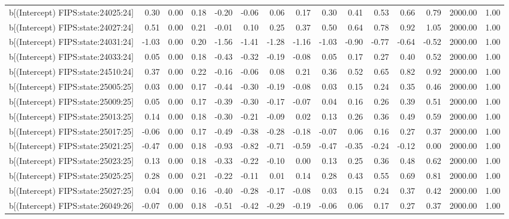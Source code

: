 \begin{table}[ht]
\begin{tabular}{rrrrrrrrrrrrrrr}
  b[(Intercept) FIPS:state:24025:24] & 0.30 & 0.00 & 0.18 & -0.20 & -0.06 & 0.06 & 0.17 & 0.30 & 0.41 & 0.53 & 0.66 & 0.79 & 2000.00 & 1.00 \\ 
  b[(Intercept) FIPS:state:24027:24] & 0.51 & 0.00 & 0.21 & -0.01 & 0.10 & 0.25 & 0.37 & 0.50 & 0.64 & 0.78 & 0.92 & 1.05 & 2000.00 & 1.00 \\ 
  b[(Intercept) FIPS:state:24031:24] & -1.03 & 0.00 & 0.20 & -1.56 & -1.41 & -1.28 & -1.16 & -1.03 & -0.90 & -0.77 & -0.64 & -0.52 & 2000.00 & 1.00 \\ 
  b[(Intercept) FIPS:state:24033:24] & 0.05 & 0.00 & 0.18 & -0.43 & -0.32 & -0.19 & -0.08 & 0.05 & 0.17 & 0.27 & 0.40 & 0.52 & 2000.00 & 1.00 \\ 
  b[(Intercept) FIPS:state:24510:24] & 0.37 & 0.00 & 0.22 & -0.16 & -0.06 & 0.08 & 0.21 & 0.36 & 0.52 & 0.65 & 0.82 & 0.92 & 2000.00 & 1.00 \\ 
  b[(Intercept) FIPS:state:25005:25] & 0.03 & 0.00 & 0.17 & -0.44 & -0.30 & -0.19 & -0.08 & 0.03 & 0.15 & 0.24 & 0.35 & 0.46 & 2000.00 & 1.00 \\ 
  b[(Intercept) FIPS:state:25009:25] & 0.05 & 0.00 & 0.17 & -0.39 & -0.30 & -0.17 & -0.07 & 0.04 & 0.16 & 0.26 & 0.39 & 0.51 & 2000.00 & 1.00 \\ 
  b[(Intercept) FIPS:state:25013:25] & 0.14 & 0.00 & 0.18 & -0.30 & -0.21 & -0.09 & 0.02 & 0.13 & 0.26 & 0.36 & 0.49 & 0.59 & 2000.00 & 1.00 \\ 
  b[(Intercept) FIPS:state:25017:25] & -0.06 & 0.00 & 0.17 & -0.49 & -0.38 & -0.28 & -0.18 & -0.07 & 0.06 & 0.16 & 0.27 & 0.37 & 2000.00 & 1.00 \\ 
  b[(Intercept) FIPS:state:25021:25] & -0.47 & 0.00 & 0.18 & -0.93 & -0.82 & -0.71 & -0.59 & -0.47 & -0.35 & -0.24 & -0.12 & 0.00 & 2000.00 & 1.00 \\ 
  b[(Intercept) FIPS:state:25023:25] & 0.13 & 0.00 & 0.18 & -0.33 & -0.22 & -0.10 & 0.00 & 0.13 & 0.25 & 0.36 & 0.48 & 0.62 & 2000.00 & 1.00 \\ 
  b[(Intercept) FIPS:state:25025:25] & 0.28 & 0.00 & 0.21 & -0.22 & -0.11 & 0.01 & 0.14 & 0.28 & 0.43 & 0.55 & 0.69 & 0.81 & 2000.00 & 1.00 \\ 
  b[(Intercept) FIPS:state:25027:25] & 0.04 & 0.00 & 0.16 & -0.40 & -0.28 & -0.17 & -0.08 & 0.03 & 0.15 & 0.24 & 0.37 & 0.42 & 2000.00 & 1.00 \\ 
  b[(Intercept) FIPS:state:26049:26] & -0.07 & 0.00 & 0.18 & -0.51 & -0.42 & -0.29 & -0.19 & -0.06 & 0.06 & 0.17 & 0.27 & 0.37 & 2000.00 & 1.00 \\ 

\end{tabular}
\end{table}
